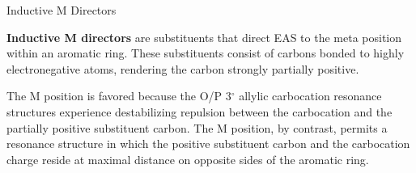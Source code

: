       \begin{core}{Inductive M Directors}

        \textbf{Inductive M directors} are substituents that direct EAS to the meta position within an aromatic ring. These substituents consist of carbons bonded to highly electronegative atoms, rendering the carbon strongly partially positive.


        The M position is favored because the O/P 3$^\circ$ allylic carbocation resonance structures experience destabilizing repulsion between the carbocation and the partially positive substituent carbon. The M position, by contrast, permits a resonance structure in which the positive substituent carbon and the carbocation charge reside at maximal distance on opposite sides of the aromatic ring.



\end{core}
